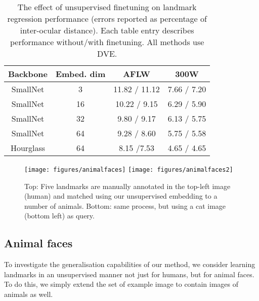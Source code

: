 \documentclass[10pt,twocolumn,letterpaper]{article}
\begin{document}
\begin{table}[t]
\setlength\tabcolsep{6.2pt}
\centering
\begin{tabular}{cccc}
\toprule
Backbone & Embed. dim & AFLW & 300W \\
\midrule
SmallNet & 3  & 11.82 / 11.12 & 7.66 / 7.20 \\
SmallNet & 16 & 10.22 / 9.15 & 6.29 / 5.90  \\
SmallNet & 32 & 9.80 / 9.17 & 6.13 / 5.75  \\
SmallNet & 64 & 9.28 / 8.60 & 5.75 / 5.58  \\
Hourglass & 64 & 8.15 /7.53 & 4.65 / 4.65  \\
\bottomrule
\end{tabular}
\medskip
\caption{The effect of unsupervised finetuning on landmark regression performance (errors reported as percentage of inter-ocular distance). Each table entry describes performance without/with finetuning.  All methods use DVE.}
\vspace{-0.4cm}
\label{t:ftablation}
\end{table}

\begin{figure*}[t!]
\centering
\texttt{[image: figures/animalfaces]}\vspace{-2pt}
\texttt{[image: figures/animalfaces2]}
\caption{Top: Five landmarks are manually annotated in the top-left image (human) and matched using our unsupervised embedding to a number of animals.
Bottom: same process, but using a cat image (bottom left) as query.}\label{f:animalfaces}
\vspace{-1em}
\end{figure*}



\subsection{Animal faces}\label{s:cross}
To investigate the generalisation capabilities of our method, we consider learning landmarks in an unsupervised manner not just for humans, but for animal faces.
To do this, we simply extend the set  of example image to contain images of animals as well.
\end{document}
